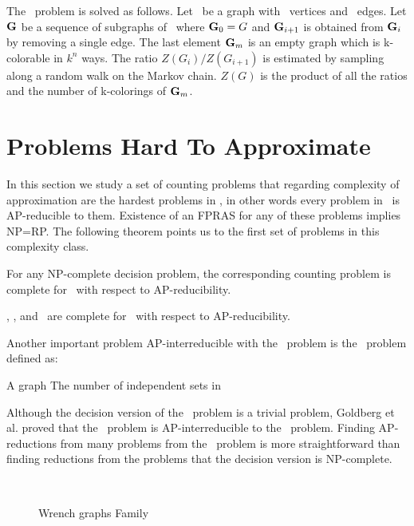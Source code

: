 The \ldkcol\ problem is solved as follows. Let \mG\ be a graph with \mn\ vertices
and \mm\ edges. Let \(\mathbf{G}\) be a sequence of subgraphs of \mG\ where
\(\mathbf{G}_0=G\) and \(\mathbf{G}_{i+1}\) is obtained from \(\mathbf{G}_i\) by removing a single edge. 
The last element \(\mathbf{G}_m\) is an empty graph which is k-colorable in \(k^n\) ways.
The ratio \(Z(G_i)/Z(G_{i+1})\) is estimated
by sampling along a random walk on the Markov chain. \(Z(G)\) is the product of all the
ratios and the number of k-colorings of \(\mathbf{G}_m\).


\section{Problems Hard To Approximate} \label{sec:hard}
In this section we study a set of counting problems that regarding complexity
of approximation are the hardest problems in \cp, in other words every
problem in \cp\ is AP-reducible to them.
Existence of an FPRAS for any of these problems implies NP=RP\@. The following theorem 
points us to the first set of problems in this complexity class.

\begin{theorem} \label{theorem:trichotomy}
For any NP-complete decision problem, the corresponding counting problem is complete
for \cp\ with respect to AP-reducibility.
\end{theorem}

\begin{cor}
\csat, \ctsat, and \ctcol\ are complete for \cp\ with respect to AP-reducibility.
\end{cor}

Another important problem AP-interreducible with the \csat\ problem is the \cis\ problem defined as:

\pnndef%
{A graph \mG}
{The number of independent sets in \mG}

Although the decision version of the \cis\ problem is a trivial problem, Goldberg et al.
\cite{Leslie03} proved that the \cis\ problem is AP-interreducible to the \csat\ problem. 
Finding AP-reductions from many problems from the \cis\ problem is more straightforward than
finding reductions from the problems that the decision version is NP-complete.

\begin{figure}[h]
\centering 
\subfigure[\ensuremath{Wr_0}]{\label{fig:Wr0}}\hspace{4.78cm}
\subfigure[\ensuremath{Wr_1}]{\label{fig:Wr1}}\\
\subfigure[\ensuremath{Wr_2}]{\label{fig:Wr2}}\hspace{4cm}
\subfigure[\ensuremath{Wr_3}]{\label{fig:Wr3}}
\caption{Wrench graphs Family}
\label{fig:wrench}
\end{figure}

